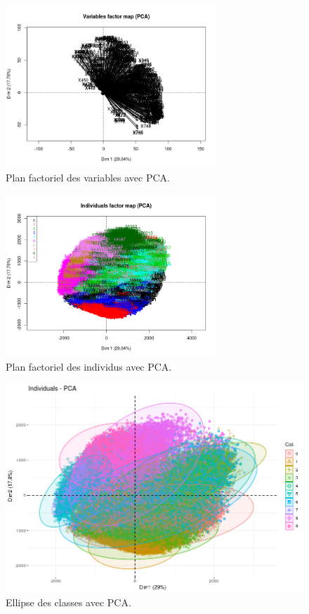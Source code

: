 \documentclass{article}
\begin{document}
\begin{figure}[H] 
\centering
\includegraphics[width=300px]{pca_var_factor_map.png}
\caption{Plan factoriel des variables avec PCA.}
\label{fig:pca_var}
\end{figure}

\begin{figure}[H] 
\centering
\includegraphics[width=300px]{pca_ind_factor_map.png}
\caption{Plan factoriel des individus avec PCA.}
\label{fig:pca_ind}
\end{figure}

\begin{figure}[H] 
\centering
\includegraphics[width=\textwidth]{pca_ellipses.png}
\caption{Ellipse des classes avec PCA.}
\label{fig:pca_ellipse_classe}
\end{figure}
\end{document}

